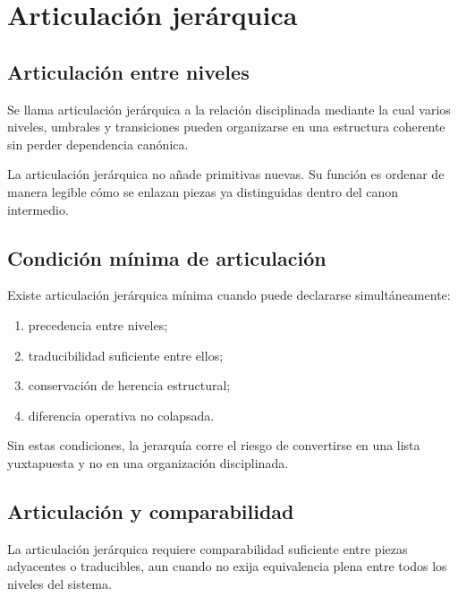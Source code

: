 \chapter{Articulación jerárquica}

\section{Articulación entre niveles}
\begin{definition}
Se llama articulación jerárquica a la relación disciplinada mediante la cual varios niveles, umbrales y transiciones pueden organizarse en una estructura coherente sin perder dependencia canónica.
\end{definition}

\begin{observation}
La articulación jerárquica no añade primitivas nuevas. Su función es ordenar de manera legible cómo se enlazan piezas ya distinguidas dentro del canon intermedio.
\end{observation}

\section{Condición mínima de articulación}
\begin{definition}
Existe articulación jerárquica mínima cuando puede declararse simultáneamente:
\begin{enumerate}
  \item precedencia entre niveles;
  \item traducibilidad suficiente entre ellos;
  \item conservación de herencia estructural;
  \item diferencia operativa no colapsada.
\end{enumerate}
\end{definition}

\begin{observation}
Sin estas condiciones, la jerarquía corre el riesgo de convertirse en una lista yuxtapuesta y no en una organización disciplinada.
\end{observation}

\section{Articulación y comparabilidad}
\begin{definition}
La articulación jerárquica requiere comparabilidad suficiente entre piezas adyacentes o traducibles, aun cuando no exija equivalencia plena entre todos los niveles del sistema.
\end{definition}

